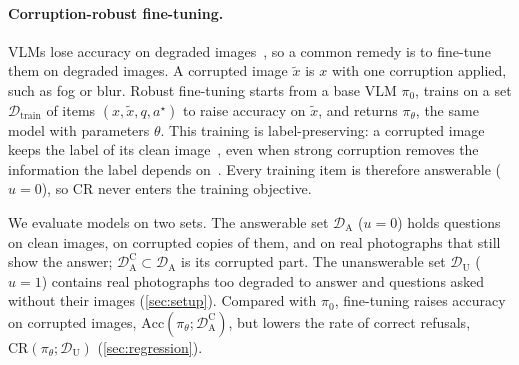 \paragraph{Corruption-robust fine-tuning.}
VLMs lose accuracy on degraded images~\cite{usama2025analysing}, so a common remedy is to fine-tune them on degraded images. A corrupted image $\tilde{x}$ is $x$ with one corruption applied, such as fog or blur. Robust fine-tuning starts from a base VLM $\pi_0$, trains on a set $\mathcal{D}_{\mathrm{train}}$ of items $(x, \tilde{x}, q, a^\star)$ to raise accuracy on $\tilde{x}$, and returns $\pi_\theta$, the same model with parameters $\theta$. This training is label-preserving: a corrupted image keeps the label of its clean image~\cite{hendrycks2020augmix,liu2023softaug,he2026videoreasoningmodelsready}, even when strong corruption removes the information the label depends on~\cite{liu2023softaug}. Every training item is therefore answerable ($u = 0$), so $\mathrm{CR}$ never enters the training objective.

We evaluate models on two sets. The answerable set $\mathcal{D}_{\mathrm{A}}$ ($u = 0$) holds questions on clean images, on corrupted copies of them, and on real photographs that still show the answer; $\mathcal{D}_{\mathrm{A}}^{\mathrm{C}} \subset \mathcal{D}_{\mathrm{A}}$ is its corrupted part. The unanswerable set $\mathcal{D}_{\mathrm{U}}$ ($u = 1$) contains real photographs too degraded to answer and questions asked without their images (\cref{sec:setup}). Compared with $\pi_0$, fine-tuning raises accuracy on corrupted images, $\mathrm{Acc}(\pi_\theta;\mathcal{D}_{\mathrm{A}}^{\mathrm{C}})$, but lowers the rate of correct refusals, $\mathrm{CR}(\pi_\theta;\mathcal{D}_{\mathrm{U}})$ (\cref{sec:regression}).



